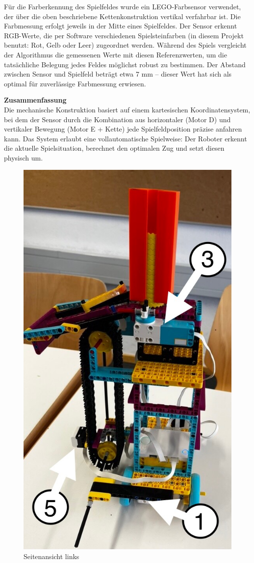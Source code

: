 \begin{itemize}
	 Für die Farberkennung des Spielfeldes wurde ein LEGO-Farbsensor verwendet, der über die oben beschriebene Kettenkonstruktion vertikal verfahrbar ist. Die Farbmessung erfolgt jeweils in der Mitte eines Spielfeldes. Der Sensor erkennt RGB-Werte, die per Software verschiedenen Spielsteinfarben (in diesem Projekt benutzt: Rot, Gelb oder Leer) zugeordnet werden. Während des Spiels vergleicht der Algorithmus die gemessenen Werte mit diesen Referenzwerten, um die tatsächliche Belegung jedes Feldes möglichst robust zu bestimmen. Der Abstand zwischen Sensor und Spielfeld beträgt etwa 7 mm – dieser Wert hat sich als optimal für zuverlässige Farbmessung erwiesen.
\end{itemize}
\textbf{Zusammenfassung}\\
Die mechanische Konstruktion basiert auf einem kartesischen Koordinatensystem, bei dem der Sensor durch die Kombination aus horizontaler (Motor D) und vertikaler Bewegung (Motor E + Kette) jede Spielfeldposition präzise anfahren kann. Das System erlaubt eine vollautomatische Spielweise: Der Roboter erkennt die aktuelle Spielsituation, berechnet den optimalen Zug und setzt diesen physisch um.


\begin{figure}[H]
	\centering
	\includegraphics[width=0.5\linewidth]{images/188CF006-D571-4F2D-9337-8C4BDD7DAAEF_1_105_c}
	\caption{Seitenansicht links}
	\label{fig:188cf006-d571-4f2d-9337-8c4bdd7daaef1105c}
\end{figure}


